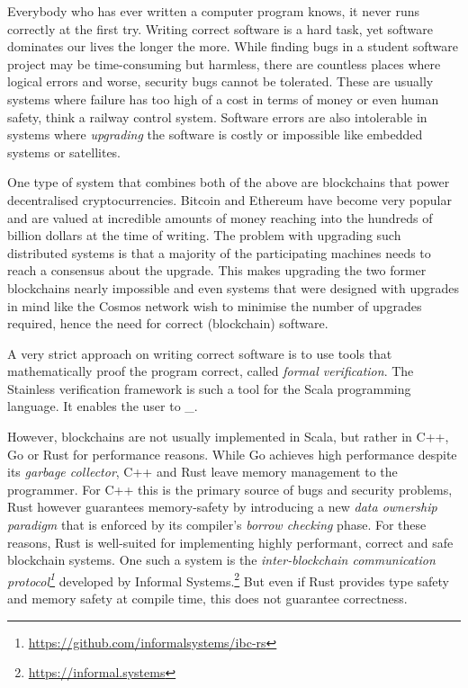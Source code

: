 Everybody who has ever written a computer program knows, it never runs
correctly at the first try. Writing correct software is a hard task, yet
software dominates our lives the longer the more. While finding bugs in
a student software project may be time-consuming but harmless, there are
countless places where logical errors and worse, security bugs cannot be
tolerated. These are usually systems where failure has too high of a
cost in terms of money or even human safety, think a railway control
system. Software errors are also intolerable in systems where
\emph{upgrading} the software is costly or impossible like embedded
systems or satellites.

One type of system that combines both of the above are blockchains that power
decentralised cryptocurrencies. Bitcoin \cite{bitcoin} and Ethereum
\cite{ethereum} have become very popular and are valued at incredible amounts of
money reaching into the hundreds of billion dollars at the time of writing. The
problem with upgrading such distributed systems is that a majority of the
participating machines needs to reach a consensus about the upgrade. This makes
upgrading the two former blockchains nearly impossible and even systems that
were designed with upgrades in mind like the Cosmos network \cite{cosmos} wish
to minimise the number of upgrades required, hence the need for correct
(blockchain) software.

A very strict approach on writing correct software is to use tools that
mathematically proof the program correct, called \emph{formal verification}. The
Stainless verification framework \cite{stainless} is such a tool for the Scala
programming language. It enables the user to \_.

However, blockchains are not usually implemented in Scala, but rather in C++, Go
or Rust for performance reasons. While Go achieves high performance despite its
\emph{garbage collector}, C++ and Rust leave memory management to the
programmer. For C++ this is the primary source of bugs and security problems,
Rust however guarantees memory-safety by introducing a new \emph{data ownership
paradigm} that is enforced by its compiler's \emph{borrow checking} phase. For
these reasons, Rust is well-suited for implementing highly performant, correct
and safe blockchain systems. One such a system is the \emph{inter-blockchain
communication
protocol\footnote{\url{https://github.com/informalsystems/ibc-rs}}} developed by
Informal Systems.\footnote{\url{https://informal.systems}} But even if Rust
provides type safety and memory safety at compile time, this does not guarantee
correctness.

